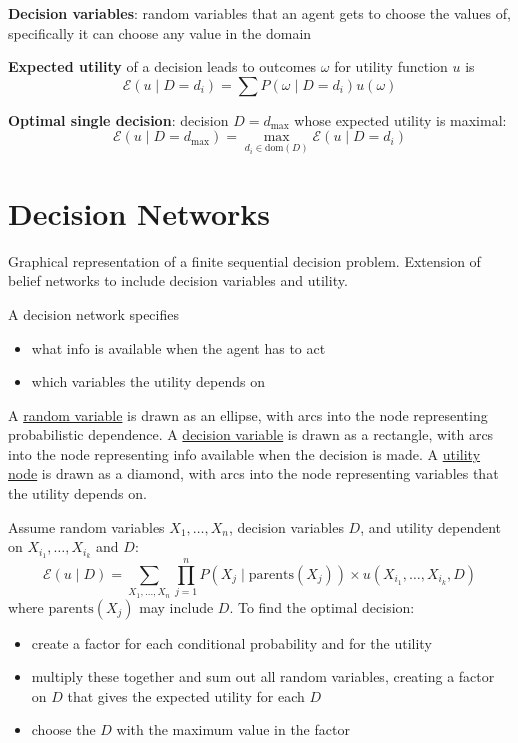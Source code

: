 \documentclass[11pt]{article}
\begin{document}
\textbf{Decision variables}: random variables that an agent gets to choose the values of, specifically
it can choose any value in the domain

\textbf{Expected utility} of a decision leads to outcomes \(\omega\) for utility function \(u\) is
$$ \mathcal{E}(u \mid D = d_{i}) = \sum P(\omega \mid D = d_{i})u(\omega) $$

\textbf{Optimal single decision}: decision \(D = d_{\max}\) whose expected utility is maximal:
$$ \mathcal{E}(u \mid D = d_{\max}) = \max_{d_{i} \in \text{dom}(D)} \mathcal{E}(u \mid D = d_{i}) $$
\section{Decision Networks}
\label{sec:org5c4e6df}
Graphical representation of a finite sequential decision problem.
Extension of belief networks to include decision variables and utility.

A decision network specifies
\begin{itemize}
\item what info is available when the agent has to act
\item which variables the utility depends on
\end{itemize}

A \uline{random variable} is drawn as an ellipse, with arcs into the node representing
probabilistic dependence.
A \uline{decision variable}  is drawn as a rectangle, with arcs into the node representing info
available when the decision is made.
A \uline{utility node} is drawn as a diamond, with arcs into the node representing variables that
the utility depends on.

Assume random variables \(X_{1}, \dots, X_{n}\), decision
variables \(D\), and utility dependent on \(X_{i_{1}}, \dots, X_{i_{k}}\) and \(D\):
$$ \mathcal{E}(u \mid D) = \sum_{X_{1}, \dots, X_{n}} \prod_{j=1}^{n} P(X_{j} \mid \text{parents}(X_{j})) \times u(X_{i_{1}}, \dots, X_{i_{k}}, D) $$
where \(\text{parents}(X_{j})\) may include \(D\).
To find the optimal decision:
\begin{itemize}
\item create a factor for each conditional probability and for the utility
\item multiply these together and sum out all random variables, creating a factor on \(D\)
that gives the expected utility for each \(D\)
\item choose the \(D\) with the maximum value in the factor
\end{itemize}
\end{document}
